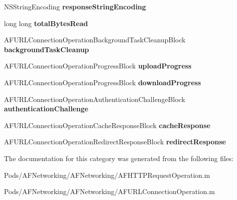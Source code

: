 \begin{DoxyCompactItemize}
N\+S\+String\+Encoding {\bfseries response\+String\+Encoding}
\item 
\mbox{\label{category_a_f_u_r_l_connection_operation_07_08_a08a500031a7a4cd7cfa97f041b471a31}} 
long long {\bfseries total\+Bytes\+Read}
\item 
\mbox{\label{category_a_f_u_r_l_connection_operation_07_08_a1a917ebf02808c01d86b0ef3d28eb5ec}} 
A\+F\+U\+R\+L\+Connection\+Operation\+Background\+Task\+Cleanup\+Block {\bfseries background\+Task\+Cleanup}
\item 
\mbox{\label{category_a_f_u_r_l_connection_operation_07_08_afe3a5f549dbbda0c5706cd6d7da0590d}} 
A\+F\+U\+R\+L\+Connection\+Operation\+Progress\+Block {\bfseries upload\+Progress}
\item 
\mbox{\label{category_a_f_u_r_l_connection_operation_07_08_a2530110594741aa405724fe3d65228be}} 
A\+F\+U\+R\+L\+Connection\+Operation\+Progress\+Block {\bfseries download\+Progress}
\item 
\mbox{\label{category_a_f_u_r_l_connection_operation_07_08_a5434bfc8e3d49e5a3f5593608772eb81}} 
A\+F\+U\+R\+L\+Connection\+Operation\+Authentication\+Challenge\+Block {\bfseries authentication\+Challenge}
\item 
\mbox{\label{category_a_f_u_r_l_connection_operation_07_08_aadc13584209a85e46794bf1aaa063581}} 
A\+F\+U\+R\+L\+Connection\+Operation\+Cache\+Response\+Block {\bfseries cache\+Response}
\item 
\mbox{\label{category_a_f_u_r_l_connection_operation_07_08_a91653021425e07347c28dc02dc650082}} 
A\+F\+U\+R\+L\+Connection\+Operation\+Redirect\+Response\+Block {\bfseries redirect\+Response}
\end{DoxyCompactItemize}


The documentation for this category was generated from the following files\+:\begin{DoxyCompactItemize}
\item 
Pods/\+A\+F\+Networking/\+A\+F\+Networking/A\+F\+H\+T\+T\+P\+Request\+Operation.\+m\item 
Pods/\+A\+F\+Networking/\+A\+F\+Networking/A\+F\+U\+R\+L\+Connection\+Operation.\+m\end{DoxyCompactItemize}
